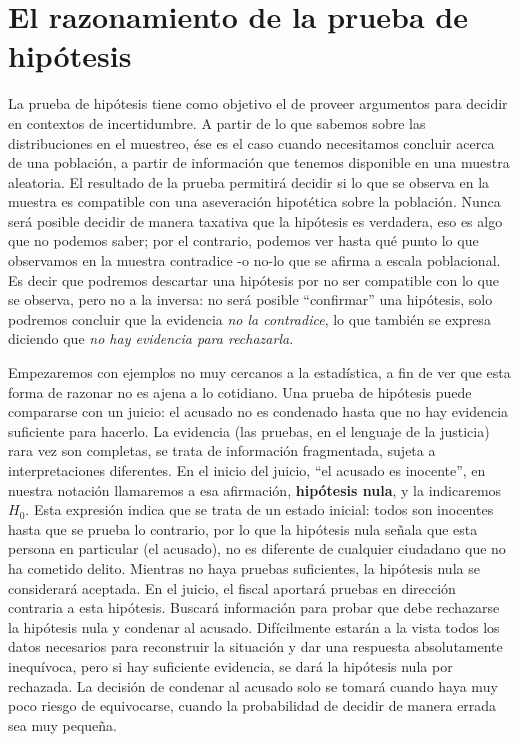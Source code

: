 \documentclass[]{book}
\begin{document}
\hypertarget{el-razonamiento-de-la-prueba-de-hipuxf3tesis}{%
\section{El razonamiento de la prueba de hipótesis}\label{el-razonamiento-de-la-prueba-de-hipuxf3tesis}}

La prueba de hipótesis tiene como objetivo el de proveer argumentos para
decidir en contextos de incertidumbre. A partir de lo que sabemos sobre
las distribuciones en el muestreo, ése es el caso cuando necesitamos
concluir acerca de una población, a partir de información que tenemos
disponible en una muestra aleatoria. El resultado de la prueba permitirá
decidir si lo que se observa en la muestra es compatible con una
aseveración hipotética sobre la población. Nunca será posible decidir de
manera taxativa que la hipótesis es verdadera, eso es algo que no
podemos saber; por el contrario, podemos ver hasta qué punto lo que
observamos en la muestra contradice -o no-lo que se afirma a escala
poblacional. Es decir que podremos descartar una hipótesis por no ser
compatible con lo que se observa, pero no a la inversa: no será posible
``confirmar'' una hipótesis, solo podremos concluir que la evidencia \emph{no la contradice}, lo que también se expresa diciendo que \emph{no hay evidencia para rechazarla}.

Empezaremos con ejemplos no muy cercanos a la estadística, a fin de ver
que esta forma de razonar no es ajena a lo cotidiano. Una prueba de
hipótesis puede compararse con un juicio: el acusado no es condenado
hasta que no hay evidencia suficiente para hacerlo. La evidencia (las
pruebas, en el lenguaje de la justicia) rara vez son completas, se trata
de información fragmentada, sujeta a interpretaciones diferentes. En el
inicio del juicio, ``el acusado es inocente'', en nuestra notación
llamaremos a esa afirmación, \textbf{hipótesis nula}, y la indicaremos
\(H_{0}\). Esta expresión indica que se trata de un estado inicial: todos
son inocentes hasta que se prueba lo contrario, por lo que la hipótesis
nula señala que esta persona en particular (el acusado), no es diferente
de cualquier ciudadano que no ha cometido delito. Mientras no haya
pruebas suficientes, la hipótesis nula se considerará aceptada. En el
juicio, el fiscal aportará pruebas en dirección contraria a esta
hipótesis. Buscará información para probar que debe rechazarse la
hipótesis nula y condenar al acusado. Difícilmente estarán a la vista
todos los datos necesarios para reconstruir la situación y dar una
respuesta absolutamente inequívoca, pero si hay suficiente evidencia, se
dará la hipótesis nula por rechazada. La decisión de condenar al acusado
solo se tomará cuando haya muy poco riesgo de equivocarse, cuando la
probabilidad de decidir de manera errada sea muy pequeña.
\end{document}
